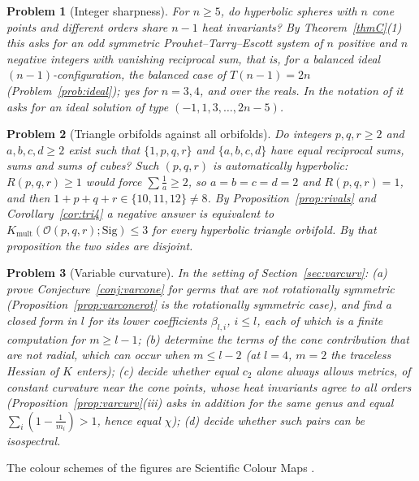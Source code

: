 \documentclass[pdflatex,sn-mathphys-num]{sn-jnl}
\theoremstyle{thmstyleone}%
\theoremstyle{thmstylethree}%
\newtheorem{problem}{Problem}%
\newcommand{\Orb}{\mathcal{O}}
\newcommand{\Sig}{\mathrm{Sig}}
\newcommand{\Kmult}{K_{\mathrm{mult}}}
\begin{document}
\begin{problem}[Integer sharpness]\label{prob:sharp}
For $n\ge5$, do hyperbolic spheres with $n$ cone points and different orders share $n-1$ heat invariants? By Theorem~\ref{thmC}(1) this asks for an odd symmetric Prouhet--Tarry--Escott system \cite[\S3]{borweiningalls1994} of $n$ positive and $n$ negative integers with vanishing reciprocal sum, that is, for a balanced ideal $(n-1)$-configuration, the balanced case of $T(n-1)=2n$ (Problem~\ref{prob:ideal}); yes for $n=3,4$, and over the reals. In the notation of \cite{chen2025survey} it asks for an ideal solution of type $(-1,1,3,\dots,2n-5)$.
\end{problem}

\begin{problem}[Triangle orbifolds against all orbifolds]\label{prob:rivals}
Do integers $p,q,r\ge2$ and $a,b,c,d\ge2$ exist such that $\{1,p,q,r\}$ and $\{a,b,c,d\}$ have equal reciprocal sums, sums and sums of cubes? Such $(p,q,r)$ is automatically hyperbolic: $R(p,q,r)\ge1$ would force $\sum\frac1a\ge2$, so $a=b=c=d=2$ and $R(p,q,r)=1$, and then $1+p+q+r\in\{10,11,12\}\ne8$. By Proposition~\ref{prop:rivals} and Corollary~\ref{cor:tri4} a negative answer is equivalent to $\Kmult(\Orb(p,q,r);\Sig)\le3$ for every hyperbolic triangle orbifold. By that proposition the two sides are disjoint.
\end{problem}

\begin{problem}[Variable curvature]\label{prob:varcurv}
In the setting of Section~\ref{sec:varcurv}: (a) prove Conjecture~\ref{conj:varcone} for germs that are not rotationally symmetric (Proposition~\ref{prop:varconerot} is the rotationally symmetric case), and find a closed form in $l$ for its lower coefficients $\beta_{l,i}$, $i\le l$, each of which is a finite computation for $m\ge l-1$; (b) determine the terms of the cone contribution that are not radial, which can occur when $m\le l-2$ (at $l=4$, $m=2$ the traceless Hessian of $K$ enters); (c) decide whether equal $c_2$ alone always allows metrics, of constant curvature near the cone points, whose heat invariants agree to all orders (Proposition~\ref{prop:varcurv}(iii) asks in addition for the same genus and equal $\sum_i(1-\frac1{m_i})>1$, hence equal $\chi$); (d) decide whether such pairs can be isospectral.
\end{problem}



\backmatter

The colour schemes of the figures are Scientific Colour Maps \cite{crameri2023}.
\end{document}
